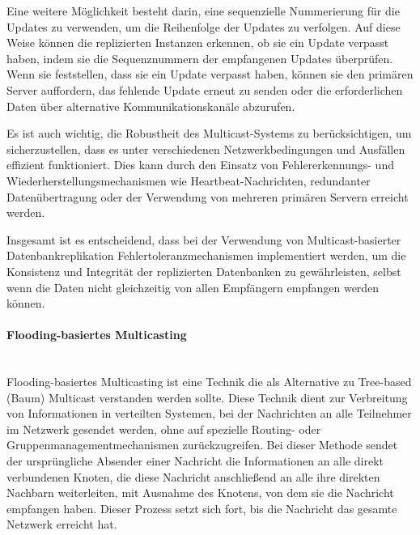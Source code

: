 \documentclass[../vs-script-first-v01.tex]{subfiles}
\begin{document}
Eine weitere Möglichkeit besteht darin, eine sequenzielle Nummerierung für die Updates zu verwenden, um die Reihenfolge der Updates zu verfolgen. Auf diese Weise können die replizierten Instanzen erkennen, ob sie ein Update verpasst haben, indem sie die Sequenznummern der empfangenen Updates überprüfen. Wenn sie feststellen, dass sie ein Update verpasst haben, können sie den primären Server auffordern, das fehlende Update erneut zu senden oder die erforderlichen Daten über alternative Kommunikationskanäle abzurufen.

Es ist auch wichtig, die Robustheit des Multicast-Systems zu berücksichtigen, um sicherzustellen, dass es unter verschiedenen Netzwerkbedingungen und Ausfällen effizient funktioniert. Dies kann durch den Einsatz von Fehlererkennungs- und Wiederherstellungsmechanismen wie Heartbeat-Nachrichten, redundanter Datenübertragung oder der Verwendung von mehreren primären Servern erreicht werden.

Insgesamt ist es entscheidend, dass bei der Verwendung von Multicast-basierter Datenbankreplikation Fehlertoleranzmechanismen implementiert werden, um die Konsistenz und Integrität der replizierten Datenbanken zu gewährleisten, selbst wenn die Daten nicht gleichzeitig von allen Empfängern empfangen werden können.
\paragraph{Flooding-basiertes Multicasting}\mbox{}\\
Flooding-basiertes Multicasting ist eine Technik die als Alternative zu Tree-based (Baum) Multicast verstanden werden sollte. Diese Technik dient zur Verbreitung von Informationen in verteilten Systemen, bei der Nachrichten an alle Teilnehmer im Netzwerk gesendet werden, ohne auf spezielle Routing- oder Gruppenmanagementmechanismen zurückzugreifen. Bei dieser Methode sendet der ursprüngliche Absender einer Nachricht die Informationen an alle direkt verbundenen Knoten, die diese Nachricht anschließend an alle ihre direkten Nachbarn weiterleiten, mit Ausnahme des Knotens, von dem sie die Nachricht empfangen haben. Dieser Prozess setzt sich fort, bis die Nachricht das gesamte Netzwerk erreicht hat.
\end{document}
